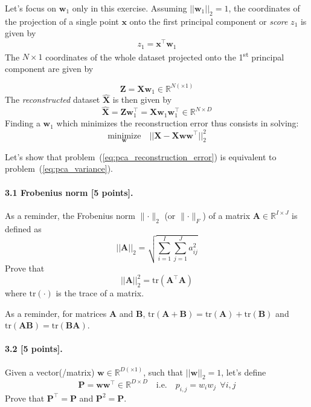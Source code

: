\documentclass{article}
\begin{document}
Let's focus on $\mathbf{w}_1$ only in this exercise.
Assuming $||\mathbf{w}_1||_2 = 1$, the coordinates of the projection of a single point $\mathbf{x}$ onto the first principal component or \emph{score} $z_1$ is given by
$$
z_1 = \mathbf{x}^\top \mathbf{w}_1
$$
The $N \times 1$ coordinates of the whole dataset projected onto the 1\textsuperscript{st} principal component are given by

$$
\mathbf{Z} = \mathbf{X} \mathbf{w}_1 \in \mathbb{R}^{N (\times 1)}
$$
The \emph{reconstructed} dataset $\hat{\mathbf{X}}$ is then given by
$$
\hat{\mathbf{X}} = \mathbf{Z} \mathbf{w}_1^\top = \mathbf{X} \mathbf{w}_1 \mathbf{w}_1^\top \in \mathbb{R}^{N \times D}
$$
Finding a $\mathbf{w}_1$ which minimizes the reconstruction error thus consists in solving:
\begin{equation}
\label{eq:pca_reconstruction_error}
\underset{\mathbf{w}}{\text{minimize}} \quad ||\mathbf{X} - \mathbf{X} \mathbf{w} \mathbf{w}^\top||_2^2
\end{equation}

Let's show that problem~(\ref{eq:pca_reconstruction_error}) is equivalent to problem~(\ref{eq:pca_variance}).

\paragraph{3.1 Frobenius norm [5 points].} As a reminder, the Frobenius norm $\lVert \cdot \rVert_2$ (or $\lVert \cdot \rVert_F$) of a matrix $\mathbf{A} \in \mathbb{R}^{I \times J}$ is defined as
$$
||\mathbf{A}||_2 = \sqrt{\sum_{i=1}^I \sum_{j=1}^J a_{ij}^2}
$$
Prove that
\begin{equation}
||\mathbf{A}||_2^2 = \text{tr}(\mathbf{A}^\top \mathbf{A})
\end{equation}
where $\text{tr}(\cdot)$ is the trace of a matrix.

As a reminder, for matrices $\mathbf{A}$ and $\mathbf{B}$,
$\text{tr}(\mathbf{A} + \mathbf{B}) = \text{tr}(\mathbf{A}) + \text{tr}(\mathbf{B})$
and $\text{tr}(\mathbf{A}\mathbf{B}) = \text{tr}(\mathbf{B}\mathbf{A})$.

\paragraph{3.2 [5 points].} Given a vector(/matrix) $\mathbf{w} \in \mathbb{R}^{D (\times 1)}$, such that $||\mathbf{w}||_2 = 1$, let's define
\begin{equation}
\label{eq:pca_projection_matrix}
\mathbf{P} = \mathbf{w}\mathbf{w}^\top \in \mathbb{R}^{D \times D}
\quad \text{i.e.} \quad p_{i,j} = w_i w_j ~~ \forall i,j
\end{equation}
Prove that $\mathbf{P}^\top = \mathbf{P}$ and $\mathbf{P}^2 = \mathbf{P}$.
\end{document}
